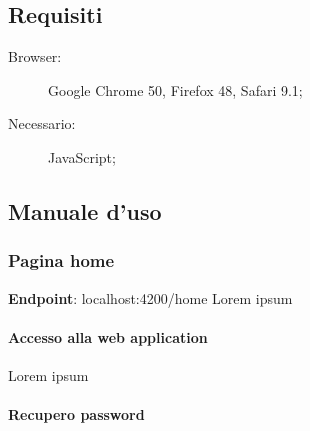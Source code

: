 \documentclass[../manuale-utente.tex]{subfiles}
\begin{document}
\subsection{Requisiti}%
\label{sub:requisiti}

\begin{description}
    \item[Browser:] Google Chrome 50, Firefox 48, Safari 9.1;
    \item[Necessario:] JavaScript;
\end{description}


\subsection{Manuale d'uso}%
\label{sub:manuale-duso-web}


\subsubsection{Pagina home}%
\label{subs:pagina-home}

%     

\textbf{Endpoint}: localhost:4200/home
Lorem ipsum

\paragraph{Accesso alla web application}%
\label{par:accesso-alla-web-application}

%     

Lorem ipsum

\paragraph{Recupero password}%
\label{par:recupero-password}

\end{document}
